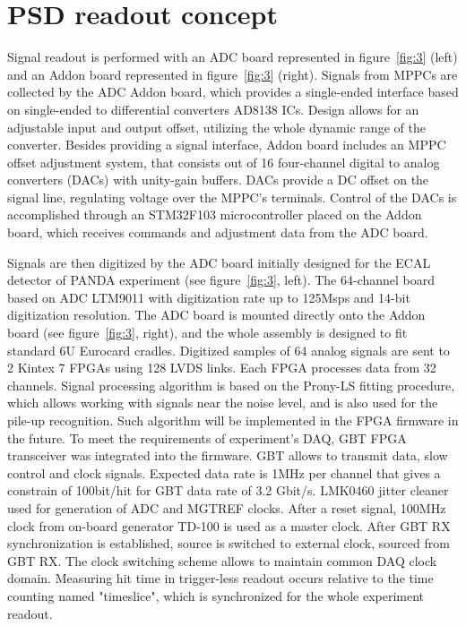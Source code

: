 \documentclass[a4paper,11pt]{article}
\begin{document}
\section{PSD readout concept}
Signal readout is performed with an ADC board represented in figure~\ref{fig:3} (left) and an Addon board represented in figure~\ref{fig:3} (right). Signals from MPPCs are collected by the ADC Addon board, which provides a single-ended interface based on single-ended to differential converters AD8138 ICs. Design allows for an adjustable input and output offset, utilizing the whole dynamic range of the converter. Besides providing a signal interface, Addon board includes an MPPC offset adjustment system, that consists out of 16 four-channel digital to analog converters (DACs) with unity-gain buffers. DACs provide a DC offset on the signal line, regulating voltage over the MPPC's terminals. Control of the DACs is accomplished through an STM32F103 microcontroller placed on the Addon board, which receives commands and adjustment data from the ADC board.

Signals are then digitized by the ADC board initially designed for the ECAL detector of PANDA experiment \cite{4} (see figure~\ref{fig:3}, left). The 64-channel board based on ADC LTM9011 with digitization rate up to 125Msps and 14-bit digitization resolution. The ADC board is mounted directly onto the Addon board (see figure~\ref{fig:3}, right), and the whole assembly is designed to fit standard 6U Eurocard cradles.
Digitized samples of 64 analog signals are sent to 2 Kintex 7 FPGAs  using 128 LVDS links. Each FPGA processes data from 32 channels. Signal
processing algorithm is based on the Prony-LS fitting procedure, which allows working with signals near the noise level, and is also used for the pile-up recognition. Such algorithm will be implemented in the FPGA firmware in the future.
To meet the requirements of experiment's DAQ, GBT FPGA transceiver was integrated into the firmware. GBT allows to transmit data, slow control and clock signals. Expected data rate is 1MHz per channel that gives a constrain of 100bit/hit for GBT data rate of 3.2 Gbit/s. 
LMK0460 jitter cleaner used for generation of ADC and MGTREF clocks. After a reset signal, 100MHz clock from on-board generator TD-100 is used as a master clock. After GBT RX synchronization is established, source is switched to external clock, sourced from GBT RX. The clock switching scheme allows to maintain common DAQ clock domain. Measuring hit time in trigger-less readout occurs relative to the time counting named "timeslice", which is synchronized for the whole experiment readout.
\end{document}
